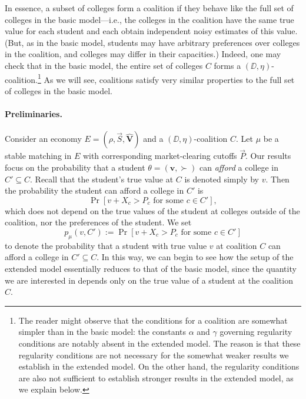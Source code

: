 \documentclass[10pt]{article}
\begin{document}
\begin{ReviewVerbatim}
In essence, a subset of colleges form a coalition if they behave like the full set of colleges in the basic model---i.e., the colleges in the coalition have the same true value for each student and each obtain independent noisy estimates of this value. (But, as in the basic model, students may have arbitrary preferences over colleges in the coalition, and colleges may differ in their capacities.) Indeed, one may check that in the basic model, the entire set of colleges $C$ forms a $(\DD,\eta)$-coalition.\footnote{The reader might observe that the conditions for a coalition are somewhat simpler than in the basic model: the constants $\alpha$ and $\gamma$ governing regularity conditions are notably absent in the extended model. The reason is that these regularity conditions are not necessary for the somewhat weaker results we establish in the extended model. On the other hand, the regularity conditions are also not sufficient to establish stronger results in the extended model, as we explain below.} As we will see, coalitions satisfy very similar properties to the full set of colleges in the basic model.

\paragraph{Preliminaries.}
Consider an economy $E = (\rho, \vec{S}, \hat{\bm{V}})$ and a $(\DD, \eta)$-coalition $C$. Let $\mu$ be a stable matching in $E$ with corresponding market-clearing cutoffs $\vec{P}$. Our results focus on the probability that a student $\theta=(\bm{v},\succ)$ can \textit{afford} a college in $C'\subseteq C$. Recall that the student's true value at $C$ is denoted simply by $v$. Then the probability the student can afford a college in $C'$ is
\begin{equation}
    \Pr[v + X_c > P_c\text{ for some $c\in C'$}],
\end{equation}
which does not depend on the true values of the student at colleges outside of the coalition, nor the preferences of the student. We set
\begin{equation}
    p_\mu(v, C') := \Pr[v + X_c > P_c\text{ for some $c\in C'$}]
\end{equation}
to denote the probability that a student with true value $v$ at coalition $C$ can afford a college in $C'\subseteq C$. In this way, we can begin to see how the setup of the extended model essentially reduces to that of the basic model, since the quantity we are interested in depends only on the true value of a student at the coalition $C$.
\end{ReviewVerbatim}
\end{document}
